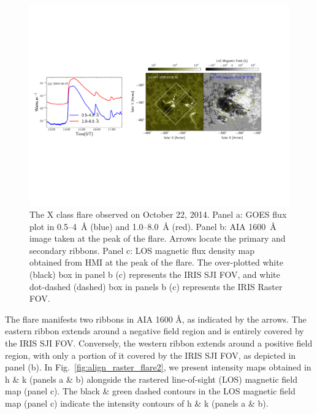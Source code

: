 \begin{figure}[ht!]
    \centering
\includegraphics[width=\textwidth,trim={0.5cm 7cm 3cm 4.5cm},clip]{Figures/Flare_X_oct22_2013.pdf}
\caption[The observations of the X flare on November 4th, 2015]{The X class flare observed on October 22, 2014. Panel a: GOES flux plot in 0.5{--}4~{\AA} (blue) and 1.0{--}8.0~{\AA} (red). Panel b: AIA 1600~{\AA} image taken at the peak of the flare. Arrows locate the primary and secondary ribbons. Panel c: LOS magnetic flux density map obtained from HMI at the peak of the flare. The over-plotted white (black) box in panel b (c) represents the IRIS SJI FOV, and white dot-dashed (dashed) box in panels b (c) represents the IRIS Raster FOV.}\label{flare2}
\end{figure}

The flare manifests two ribbons in AIA 1600 {\AA}, as indicated by the arrows. The eastern ribbon extends around a negative field region and is entirely covered by the IRIS SJI FOV. Conversely, the western ribbon extends around a positive field region, with only a portion of it covered by the IRIS SJI FOV, as depicted in panel (b). In Fig.~\ref{fig:align_raster_flare2}, we present intensity maps obtained in   h \& k (panels a \& b) alongside the rastered line-of-sight (LOS) magnetic field map (panel c). The black \& green dashed contours in the LOS magnetic field map (panel c) indicate the intensity contours of   h \& k (panels a \& b).

